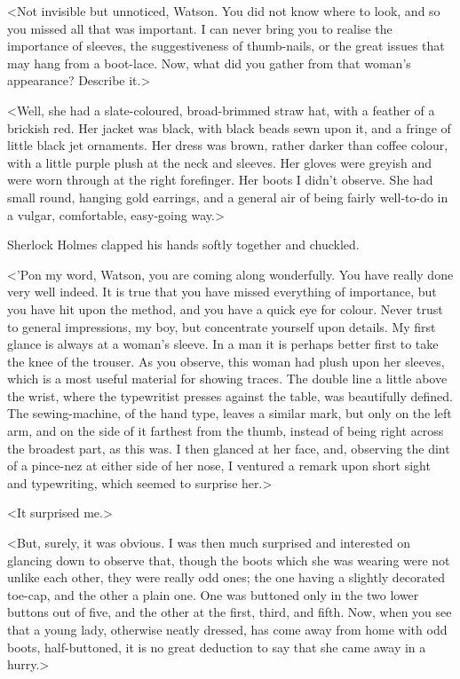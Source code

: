 <Not invisible but unnoticed, Watson. You did not know where to look, and so you missed all that was important. I can never bring you to realise the importance of sleeves, the suggestiveness of thumb-nails, or the great issues that may hang from a boot-lace. Now, what did you gather from that woman's appearance? Describe it.>

<Well, she had a slate-coloured, broad-brimmed straw hat, with a feather of a brickish red. Her jacket was black, with black beads sewn upon it, and a fringe of little black jet ornaments. Her dress was brown, rather darker than coffee colour, with a little purple plush at the neck and sleeves. Her gloves were greyish and were worn through at the right forefinger. Her boots I didn't observe. She had small round, hanging gold earrings, and a general air of being fairly well-to-do in a vulgar, comfortable, easy-going way.>

Sherlock Holmes clapped his hands softly together and chuckled.

<'Pon my word, Watson, you are coming along wonderfully. You have really done very well indeed. It is true that you have missed everything of importance, but you have hit upon the method, and you have a quick eye for colour. Never trust to general impressions, my boy, but concentrate yourself upon details. My first glance is always at a woman's sleeve. In a man it is perhaps better first to take the knee of the trouser. As you observe, this woman had plush upon her sleeves, which is a most useful material for showing traces. The double line a little above the wrist, where the typewritist presses against the table, was beautifully defined. The sewing-machine, of the hand type, leaves a similar mark, but only on the left arm, and on the side of it farthest from the thumb, instead of being right across the broadest part, as this was. I then glanced at her face, and, observing the dint of a pince-nez at either side of her nose, I ventured a remark upon short sight and typewriting, which seemed to surprise her.>

<It surprised me.>

<But, surely, it was obvious. I was then much surprised and interested on glancing down to observe that, though the boots which she was wearing were not unlike each other, they were really odd ones; the one having a slightly decorated toe-cap, and the other a plain one. One was buttoned only in the two lower buttons out of five, and the other at the first, third, and fifth. Now, when you see that a young lady, otherwise neatly dressed, has come away from home with odd boots, half-buttoned, it is no great deduction to say that she came away in a hurry.>

